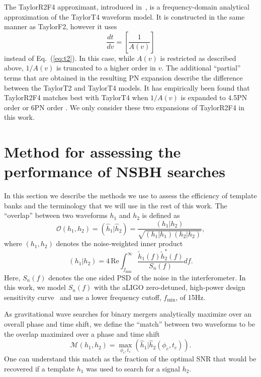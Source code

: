 The TaylorR2F4 approximant, introduced in~\cite{Nitz:2013mxa}, is a
frequency-domain analytical approximation of the TaylorT4 waveform model. It is
constructed in the same manner as TaylorF2, however it uses
%
\begin{equation}
\frac{dt}{dv} = \left[ \frac{1}{A(v)} \right]
\end{equation}
%
instead of Eq.~(\ref{eq:t2}). In this case, while $A(v)$ is restricted as
described above, $1 / A(v)$ is truncated to a
higher order in $v$. The additional ``partial'' terms that are obtained in the
resulting \ac{PN} expansion describe the difference between the TaylorT2 and
TaylorT4 models. It has empirically been found that TaylorR2F4 matches best 
with TaylorT4
when $1 / A(v)$ is expanded to 4.5\ac{PN} order or 6\ac{PN} order
\cite{Nitz:2013mxa}. We only consider these two expansions of TaylorR2F4 in this
work.

\section{Method for assessing the performance of NSBH searches}
\label{sec:bank_testing}

In this section we describe the methods we use to assess the efficiency of
template banks and the terminology that we will use in the rest of this work.
The ``overlap'' between two waveforms $h_1$ and $h_2$ is defined as
%
\begin{equation}
 \mathcal{O}(h_1,h_2) = (\hat{h}_1|\hat{h}_2) =
\dfrac{(h_1|h_2)}{\sqrt{(h_1|h_1)(h_2|h_2)}},
\end{equation}
%
where $(h_1,h_2)$ denotes the noise-weighted inner product
%
\begin{equation}
(h_1|h_2) = 4 \, \mathrm{Re}
\int^{\infty}_{f_{\mathrm{min}}}\dfrac{\tilde{h}_1(f)\tilde{h}_2^*(f)}{S_n(f)} 
df.
\end{equation}
%
Here, $S_n(f)$ denotes the one sided \ac{PSD} of the noise in the
interferometer. In this work, we model $S_n(f)$ with the \ac{aLIGO}
zero-detuned, high-power design sensitivity curve~\cite{Harry:2010zz} and use a
lower frequency cutoff, $f_{\mathrm{min}}$, of 15Hz.

As gravitational wave searches for binary mergers analytically maximize over an
overall phase and time shift, we define the ``match'' between two waveforms
to be the overlap maximized over a phase and time shift
%
\begin{equation}
\mathcal{M}(h_1,h_2) =
\underset{\phi_c,t_c}{\max}(\hat{h}_1|\hat{h}_2(\phi_c,t_c)).
\end{equation}
%
One can understand this match as the fraction of the optimal \ac{SNR} that would
be recovered if a template $h_1$ was used to search for a signal $h_2$.

